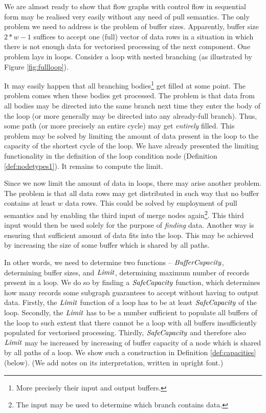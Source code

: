       We are almost ready to show that flow graphs with control flow in sequential form may be realised very easily without any need of pull semantics. The only problem we need to address is the problem of buffer sizes. Apparently, buffer size $2*w-1$ suffices to accept one (full) vector of data rows in a situation in which there is not enough data for vectorised processing of the next component. One problem lays in loops.  Consider a loop with nested branching (as illustrated by Figure \ref{fig:fullloop}). 


      It may easily happen that all branching bodies\footnote{More precisely their input and output buffers.} get filled at some point. The problem comes when these bodies get processed. The problem is that data from all bodies may be directed into the same branch next time they enter the body of the loop (or more generally may be directed into any already-full branch). Thus, some path (or more precisely an entire cycle) may get \emph{entirely} filled. This problem may be solved by limiting the amount of data present in the loop to the capacity of the shortest cycle of the loop. We have already presented the limiting functionality in the definition of the loop condition node (Definition \ref{def:nodetypes1}). It remains to compute the limit.

      Since we now limit the amount of data in loops, there may arise another problem. The problem is that all data rows may get distributed in such way that no buffer contains at least $w$ data rows. This could be solved by employment of pull semantics and by enabling the third input of merge nodes again\footnote{The input may be used to determine which branch contains data.}. This third input would then be used solely for the purpose of \emph{finding} data. Another way is ensuring that sufficient amount of data fits into the loop. This may be achieved by increasing the size of some buffer which is shared by all paths.

      In other words, we need to determine two functions -- $\mf{bufferCapacity}$, determining buffer sizes, and $\mf{limit}$, determining maximum number of records present in a loop. We do so by finding a $\mf{safeCapacity}$ function, which determines how many records some subgraph guarantees to accept without having to output data. Firstly, the $\mf{limit}$ function of a loop has to be at least $\mf{safeCapacity}$ of the loop. Secondly, the $\mf{limit}$ has to be a number sufficient to populate all buffers of the loop to such extent that there cannot be a loop with all buffers insufficiently populated for vectorised processing. Thirdly, $\mf{safeCapacity}$ and therefore also $\mf{limit}$ may be increased by increasing of buffer capacity of a node which is shared by all paths of a loop. We show such a construction in Definition \ref{def:capacities} (below). (We add notes on its interpretation, written in upright font.)

